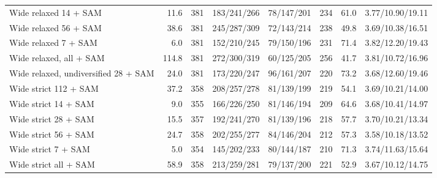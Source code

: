 \begin{tabular}{lrrrrrrr}
Wide relaxed 14 + SAM & 11.6 & 381 & 183/241/266 & 78/147/201 & 234 & 61.0 & 3.77/10.90/19.11 \\
Wide relaxed 56 + SAM & 38.6 & 381 & 245/287/309 & 72/143/214 & 238 & 49.8 & 3.69/10.38/16.51 \\
Wide relaxed 7 + SAM & 6.0 & 381 & 152/210/245 & 79/150/196 & 231 & 71.4 & 3.82/12.20/19.43 \\
Wide relaxed, all + SAM & 114.8 & 381 & 272/300/319 & 60/125/205 & 256 & 41.7 & 3.81/10.72/16.96 \\
Wide relaxed, undiversified 28 + SAM & 24.0 & 381 & 173/220/247 & 96/161/207 & 220 & 73.2 & 3.68/12.60/19.46 \\
Wide strict 112 + SAM & 37.2 & 358 & 208/257/278 & 81/139/199 & 219 & 54.1 & 3.69/10.21/14.00 \\
Wide strict 14 + SAM & 9.0 & 355 & 166/226/250 & 81/146/194 & 209 & 64.6 & 3.68/10.41/14.97 \\
Wide strict 28 + SAM & 15.5 & 357 & 192/241/270 & 81/139/196 & 218 & 57.7 & 3.70/10.21/13.34 \\
Wide strict 56 + SAM & 24.7 & 358 & 202/255/277 & 84/146/204 & 212 & 57.3 & 3.58/10.18/13.52 \\
Wide strict 7 + SAM & 5.0 & 354 & 145/202/233 & 80/144/187 & 210 & 71.3 & 3.74/11.63/15.64 \\
Wide strict all + SAM & 58.9 & 358 & 213/259/281 & 79/137/200 & 221 & 52.9 & 3.67/10.12/14.75 \\
\bottomrule
\end{tabular}
